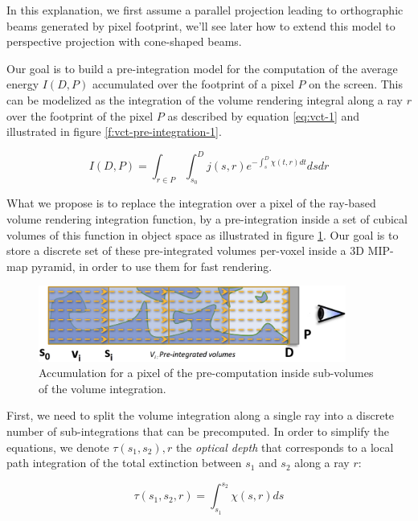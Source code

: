 In this explanation, we first assume a parallel projection leading to orthographic beams generated by pixel footprint, we'll see later how to extend this model to perspective projection with cone-shaped beams.



Our goal is to build a pre-integration model for the computation of the average energy $I(D,P)$ accumulated over the footprint of a pixel $P$ on the screen. This can be modelized as the integration of the volume rendering integral along a ray $r$ over the footprint of the pixel $P$ as described by equation \ref{eq:vct-1} and illustrated in figure \ref{f:vct-pre-integration-1}. 

\begin{equation}\label{eq:vct-1}
	I(D,P)=\int_{r\in P}\int^{D}_{s_0}j(s,r)e^{-\int^{D}_s\chi(t,r)dt}dsdr
\end{equation}

What we propose is to replace the integration over a pixel of the ray-based volume rendering integration function, by a pre-integration inside a set of cubical volumes of this function in object space as illustrated in figure \ref{f:vct-pre-integration-2}. Our goal is to store a discrete set of these pre-integrated volumes per-voxel inside a 3D MIP-map pyramid, in order to use them for fast rendering.

\begin{figure}\label{f:vct-pre-integration-2}
	\begin{center}
		\includegraphics[width=0.9\textwidth]{graphics/vct/vct-7-2}
	\end{center}
	\caption{Accumulation for a pixel of the pre-computation inside sub-volumes of the volume integration.}
\end{figure}

First, we need to split the volume integration along a single ray into a discrete number of sub-integrations that can be precomputed. In order to simplify the equations, we denote $\tau(s_1,s_2),r$ the \textit{optical depth} that corresponds to a local path integration of the total extinction between $s_1$ and $s_2$ along a ray $r$:

\begin{equation*}
	\tau(s_1,s_2,r)=\int^{s_2}_{s_1}\chi(s,r)ds
\end{equation*}

